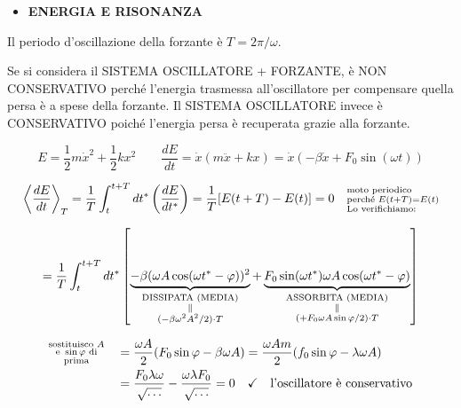 \documentclass{article}
\begin{document}
\vspace{0.5cm}
\begin{itemize}
\item \textbf{ENERGIA E RISONANZA}
\end{itemize}
Il periodo d'oscillazione della forzante è $T = 2\pi/\omega$.

Se si considera il SISTEMA OSCILLATORE + FORZANTE, è NON CONSERVATIVO perché l'energia trasmessa all'oscillatore per compensare quella persa è a spese della forzante.
Il SISTEMA OSCILLATORE invece è CONSERVATIVO poiché l'energia persa è recuperata grazie alla forzante.

\begin{equation*}
E = \frac{1}{2}m\dot{x}^2 + \frac{1}{2}kx^2 \qquad \frac{dE}{dt} = \dot{x}(m\ddot{x} + kx) = \dot{x}(-\beta\dot{x} + F_0\sin(\omega t))
\end{equation*}

\begin{equation*}
\left\langle \frac{dE}{dt} \right\rangle_T = \frac{1}{T} \int_t^{t+T} dt^* \left( \frac{dE}{dt^*} \right) = \frac{1}{T} [E(t+T) - E(t)] = 0 \quad \begin{subarray}{l} \text{moto periodico} \\ \text{perché } E(t+T)=E(t) \\ \text{Lo verifichiamo:} \end{subarray}
\end{equation*}

\begin{equation*}
= \frac{1}{T} \int_t^{t+T} dt^* \left[ \underbrace{-\beta(\omega A \cos(\omega t^* - \varphi))^2}_{\begin{subarray}{c} \text{DISSIPATA (MEDIA)} \\ \parallel \\ (-\beta \omega^2 A^2 / 2) \cdot T \end{subarray}} + \underbrace{F_0 \sin(\omega t^*) \omega A \cos(\omega t^* - \varphi)}_{\begin{subarray}{c} \text{ASSORBITA (MEDIA)} \\ \parallel \\ (+F_0 \omega A \sin\varphi / 2) \cdot T \end{subarray}} \right]
\end{equation*}

\begin{align*}
\begin{subarray}{c} \text{sostituisco } A \\ \text{e } \sin\varphi \text{ di} \\ \text{prima} \end{subarray} \quad &= \frac{\omega A}{2} (F_0 \sin\varphi - \beta \omega A) = \frac{\omega A m}{2} (f_0 \sin\varphi - \lambda \omega A) \\
&= \frac{F_0 \lambda \omega}{\sqrt{\dots}} - \frac{\omega \lambda F_0}{\sqrt{\dots}} = 0 \quad \checkmark \quad \text{l'oscillatore è conservativo}
\end{align*}
\end{document}
